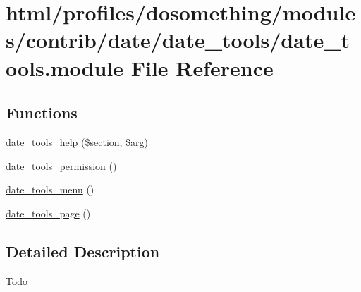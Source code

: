 \hypertarget{date__tools_8module}{
\section{html/profiles/dosomething/modules/contrib/date/date\_\-tools/date\_\-tools.module File Reference}
\label{date__tools_8module}
}
\subsection*{Functions}
\begin{DoxyCompactItemize}
\item 
\hyperlink{date__tools_8module_a3a987dd4bcf123ce3578e7510566f026}{date\_\-tools\_\-help} (\$section, \$arg)
\item 
\hyperlink{date__tools_8module_ac007e8a645addfc1c9b043f085b4cf02}{date\_\-tools\_\-permission} ()
\item 
\hyperlink{date__tools_8module_aedbe49d3794ad882e2cd8482ee7498b1}{date\_\-tools\_\-menu} ()
\item 
\hyperlink{date__tools_8module_a5207aac2d00ede5fa29257410b3fb68d}{date\_\-tools\_\-page} ()
\end{DoxyCompactItemize}


\subsection{Detailed Description}
\begin{Desc}
\item[\hyperlink{todo__todo000053}{Todo}]\end{Desc}


